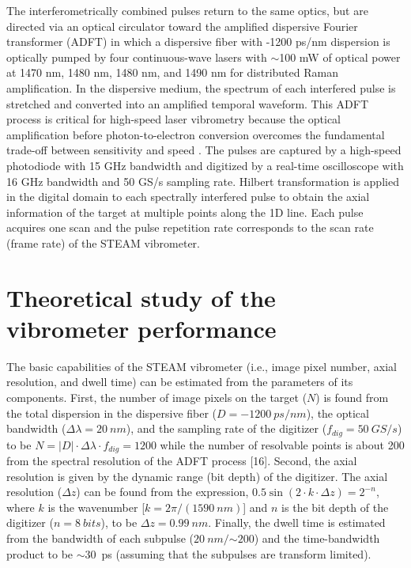The interferometrically combined pulses return to the same optics, but are directed via an optical circulator toward the amplified dispersive Fourier transformer (ADFT) \cite{goda2009serial, goda2008amplified, goda2009theory} in which a dispersive fiber with -1200 ps/nm dispersion is optically pumped by four continuous-wave lasers with $\sim$100 mW of optical power at 1470 nm, 1480 nm, 1480 nm, and 1490 nm for distributed Raman amplification. In the dispersive medium, the spectrum of each interfered pulse is stretched and converted into an amplified temporal waveform. This ADFT process is critical for high-speed laser vibrometry because the optical amplification before photon-to-electron conversion overcomes the fundamental trade-off between sensitivity and speed \cite{goda2009serial, goda2009theory}. The pulses are captured by a high-speed photodiode with 15 GHz bandwidth and digitized by a real-time oscilloscope with 16 GHz bandwidth and 50 GS/s sampling rate. Hilbert transformation is applied in the digital domain to each spectrally interfered pulse to obtain the axial information of the target at multiple points along the 1D line. Each pulse acquires one scan and the pulse repetition rate corresponds to the scan rate (frame rate) of the STEAM vibrometer.

\section{Theoretical study of the vibrometer performance}

The basic capabilities of the STEAM vibrometer (i.e., image pixel number, axial resolution, and dwell time) can be estimated from the parameters of its components. First, the number of image pixels on the target ($ N $) is found from the total dispersion in the dispersive fiber ($ D = \SI{-1200}{ps/nm} $), the optical bandwidth ($ \Delta\lambda = \SI{20}{nm} $), and the sampling rate of the digitizer ($ f_{dig} = \SI{50}{GS/s} $) to be $ N = |D| \cdot \Delta\lambda \cdot f_{dig} = 1200 $ while the number of resolvable points is about 200 from the spectral resolution of the ADFT process [16]. Second, the axial resolution is given by the dynamic range (bit depth) of the digitizer. The axial resolution ($\Delta z$) can be found from the expression, $0.5 \sin(2 \cdot k \cdot \Delta z) = 2^{-n}$, where $k$ is the wavenumber [$k = 2 \pi / (\SI{1590}{nm})$] and $n$ is the bit depth of the digitizer ($n = \SI{8}{bits}$), to be $\Delta z = \SI{0.99}{nm}$. Finally, the dwell time is estimated from the bandwidth of each subpulse ($\SI{20}{nm} /$$\sim$$\num{200}$) and the time-bandwidth product to be $\sim$\SI{30}{ps} (assuming that the subpulses are transform limited).

